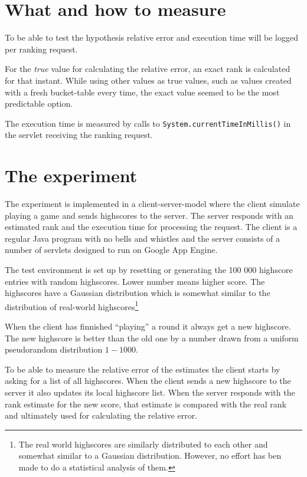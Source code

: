 

\section{What and how to measure}

To be able to test the hypothesis relative error and execution time will be logged per ranking request.

For the \emph{true} value for calculating the relative error, an exact rank is calculated for that instant. While using other values as true values, such as values created with a fresh bucket-table every time, the exact value seemed to be the most predictable option.

The execution time is measured by calls to \texttt{System.currentTimeInMillis()} in the servlet receiving the ranking request.

\section{The experiment}

The experiment is implemented in a client-server-model where the client simulate playing a game and sends highscores to the server. The server responds with an estimated rank and the execution time for processing the request. The client is a regular Java program with no bells and whistles and the server consists of a number of servlets designed to run on Google App Engine. 

The test environment is set up by resetting or generating the 100 000 highscore entries with random highscores. Lower number means higher score. The highscores have a Gaussian distribution which is somewhat similar to the distribution of real-world highscores\footnote{The real world highscores are similarly distributed to each other and somewhat similar to a Gaussian distribution. However, no effort has ben made to do a statistical analysis of them.}


When the client has finnished ``playing'' a round it always get a new highscore. The new highscore is better than the old one by a number drawn from a uniform pseudorandom distribution $1-1000$.

To be able to measure the relative error of the estimates the client starts by asking for a list of all highscores. When the client sends a new highscore to the server it also updates its local highscore list. When the server responds with the rank estimate for the new score, that estimate is compared with the real rank and ultimately used for calculating the relative error.

